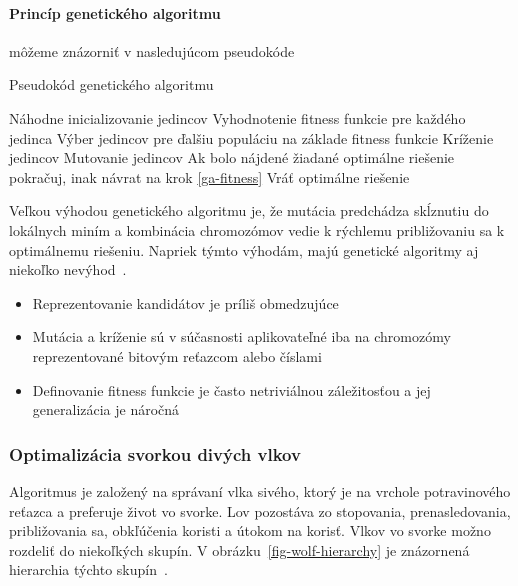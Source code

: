 \documentclass[a4paper,slovak,12pt,appendix]{article}
\begin{document}
\paragraph{Princíp genetického algoritmu} môžeme znázorniť v nasledujúcom
pseudokóde~\cite{Chavan2015}
\begin{algorithm}
  \caption{Pseudokód genetického algoritmu}
  \begin{algorithmic}[1]
    \State Náhodne inicializovanie jedincov
    \State Vyhodnotenie fitness funkcie pre každého jedinca \label{ga-fitness}
    \State Výber jedincov pre ďalšiu populáciu na základe fitness funkcie
    \State Kríženie jedincov
    \State Mutovanie jedincov
    \State Ak bolo nájdené žiadané optimálne riešenie pokračuj, inak návrat na krok \ref{ga-fitness}
    \State Vráť optimálne riešenie
  \end{algorithmic}
\end{algorithm}

Veľkou výhodou genetického algoritmu je, že mutácia predchádza skĺznutiu do
lokálnych miním a kombinácia chromozómov vedie k rýchlemu približovaniu
sa k optimálnemu riešeniu. Napriek týmto výhodám, majú genetické algoritmy aj
niekoľko nevýhod~\cite{Deolekar2016}.
\begin{itemize}
  \item Reprezentovanie kandidátov je príliš obmedzujúce
  \item Mutácia a kríženie sú v súčasnosti aplikovateľné iba na chromozómy
        reprezentované bitovým reťazcom alebo číslami
  \item Definovanie fitness funkcie je často netriviálnou záležitosťou
        a jej generalizácia je náročná
\end{itemize}


\subsubsection{Optimalizácia svorkou divých vlkov}
Algoritmus je založený na správaní vlka sivého, ktorý je na vrchole
potravinového reťazca a preferuje život vo svorke. Lov pozostáva zo stopovania,
prenasledovania, približovania sa, obkľúčenia koristi a útokom na korisť. Vlkov
vo svorke možno rozdeliť do niekoľkých skupín.
V obrázku~\ref{fig-wolf-hierarchy} je znázornená hierarchia týchto
skupín~\cite{Seeley1991}.
\end{document}
